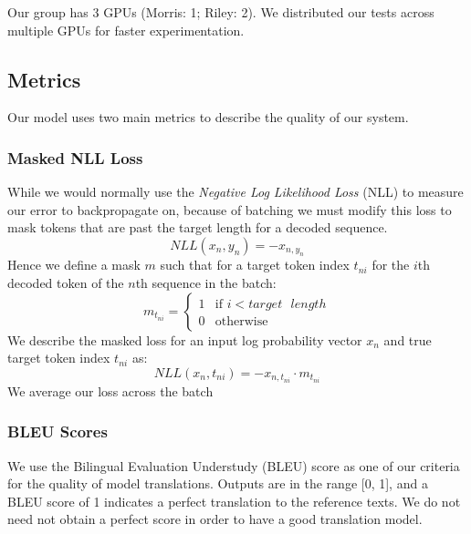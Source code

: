 \documentclass[twoside,twocolumn]{article}
\begin{document}
Our group has 3 GPUs (Morris: 1; Riley: 2). We distributed our tests across
multiple GPUs for faster experimentation.
\subsection{Metrics}
Our model uses two main metrics to describe the quality of our system.
\subsubsection{Masked NLL Loss}
\label{sec:masked-loss}
While we would normally use the \emph{Negative Log Likelihood Loss} (NLL) to
measure our error to backpropagate on, because of batching we must modify this
loss to mask tokens that are past the target length for a decoded sequence.
\begin{equation}
  NLL(x_n, y_n) = -x_{n, y_n}
\end{equation}
Hence we define a mask $m$ such that for a target token index $t_{ni}$ for the
$i$th decoded token of the $n$th sequence in the batch:
\begin{equation}
  m_{t_{ni}} = \begin{cases}
    1 & \text{if } i < target \text{ } length \\
    0 & \text{otherwise}
  \end{cases}
\end{equation}
We describe the masked loss for an input log probability vector $x_n$ and true
target token index $t_{ni}$ as:
\begin{equation}
  NLL(x_n, t_{ni}) = -x_{n, t_{ni}} \cdot m_{t_{ni}}
\end{equation}
We average our loss across the batch
\subsubsection{BLEU Scores}
\label{sec:bleu}
We use the Bilingual Evaluation Understudy (BLEU) score as one of our criteria
for the quality of model translations. Outputs are in the range [0, 1], and a
BLEU score of 1 indicates a perfect translation to the reference texts.
We do not need not obtain a perfect score in order to have a good
translation model.
\end{document}
